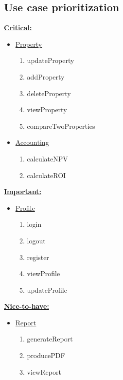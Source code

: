 \documentclass[a4paper,12pt]{article}
\begin{document}
\subsection{Use case prioritization}
 \underline{\textbf{Critical:}}
	\begin{itemize}
		\item \underline{Property}
			\begin{enumerate}
				\item updateProperty
				\item addProperty
				\item deleteProperty
				\item viewProperty
				\item compareTwoProperties
			\end{enumerate}
		\item \underline{Accounting}
			\begin{enumerate}
				\item calculateNPV
				\item calculateROI
			\end{enumerate}
	\end{itemize}

\underline{\textbf{Important:}}
	\begin{itemize}
		\item \underline{Profile}
			\begin{enumerate}
				\item login
				\item logout
				\item register
				\item viewProfile
				\item updateProfile
			\end {enumerate}

	\end{itemize}

\underline{\textbf{Nice-to-have:}}
	\begin{itemize}
		\item \underline{Report}
			\begin{enumerate}
				\item generateReport
				\item producePDF
				\item viewReport
			\end{enumerate}
	\end{itemize}

\end{document}
